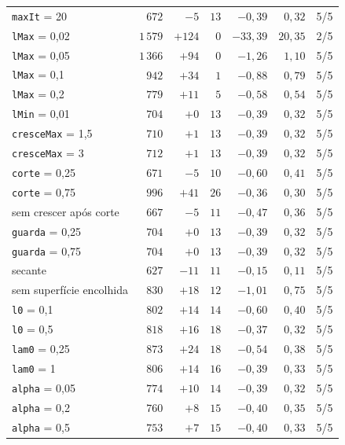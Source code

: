 \documentclass[11pt,a4paper]{article}
\numberwithin{equation}{section}
\begin{document}
{\begin{longtable}{p{6.4cm}rrrrrc}
\texttt{maxIt} = 20 & $672$ & $-5$ & $13$ & $-0{,}39$ & $0{,}32$ & 5/5 \\
\texttt{lMax} = 0,02 & $1\,579$ & $+$$124$ & $0$ & $-33{,}39$ & $20{,}35$ & 2/5 \\
\texttt{lMax} = 0,05 & $1\,366$ & $+$$94$ & $0$ & $-1{,}26$ & $1{,}10$ & 5/5 \\
\texttt{lMax} = 0,1 & $942$ & $+$$34$ & $1$ & $-0{,}88$ & $0{,}79$ & 5/5 \\
\texttt{lMax} = 0,2 & $779$ & $+$$11$ & $5$ & $-0{,}58$ & $0{,}54$ & 5/5 \\
\texttt{lMin} = 0,01 & $704$ & $+$$0$ & $13$ & $-0{,}39$ & $0{,}32$ & 5/5 \\
\texttt{cresceMax} = 1,5 & $710$ & $+$$1$ & $13$ & $-0{,}39$ & $0{,}32$ & 5/5 \\
\texttt{cresceMax} = 3 & $712$ & $+$$1$ & $13$ & $-0{,}39$ & $0{,}32$ & 5/5 \\
\texttt{corte} = 0,25 & $671$ & $-5$ & $10$ & $-0{,}60$ & $0{,}41$ & 5/5 \\
\texttt{corte} = 0,75 & $996$ & $+$$41$ & $26$ & $-0{,}36$ & $0{,}30$ & 5/5 \\
sem crescer após corte & $667$ & $-5$ & $11$ & $-0{,}47$ & $0{,}36$ & 5/5 \\
\texttt{guarda} = 0,25 & $704$ & $+$$0$ & $13$ & $-0{,}39$ & $0{,}32$ & 5/5 \\
\texttt{guarda} = 0,75 & $704$ & $+$$0$ & $13$ & $-0{,}39$ & $0{,}32$ & 5/5 \\
secante & $627$ & $-11$ & $11$ & $-0{,}15$ & $0{,}11$ & 5/5 \\
sem superfície encolhida & $830$ & $+$$18$ & $12$ & $-1{,}01$ & $0{,}75$ & 5/5 \\
\texttt{l0} = 0,1 & $802$ & $+$$14$ & $14$ & $-0{,}60$ & $0{,}40$ & 5/5 \\
\texttt{l0} = 0,5 & $818$ & $+$$16$ & $18$ & $-0{,}37$ & $0{,}32$ & 5/5 \\
\texttt{lam0} = 0,25 & $873$ & $+$$24$ & $18$ & $-0{,}54$ & $0{,}38$ & 5/5 \\
\texttt{lam0} = 1 & $806$ & $+$$14$ & $16$ & $-0{,}39$ & $0{,}33$ & 5/5 \\
\texttt{alpha} = 0,05 & $774$ & $+$$10$ & $14$ & $-0{,}39$ & $0{,}32$ & 5/5 \\
\texttt{alpha} = 0,2 & $760$ & $+$$8$ & $15$ & $-0{,}40$ & $0{,}35$ & 5/5 \\
\texttt{alpha} = 0,5 & $753$ & $+$$7$ & $15$ & $-0{,}40$ & $0{,}33$ & 5/5 \\
\end{longtable}
}
\end{document}
